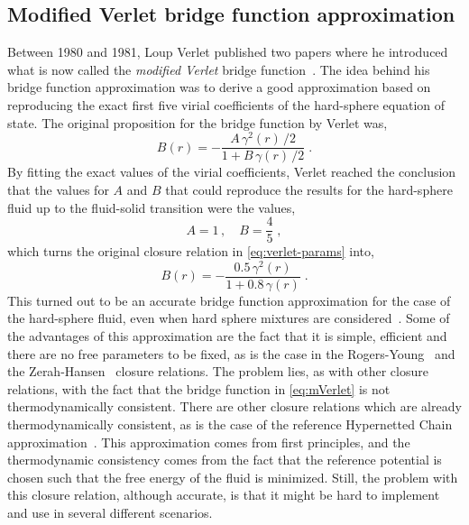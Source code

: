\subsection{Modified Verlet bridge function approximation}
Between 1980 and 1981, Loup Verlet published two papers where he introduced what is now 
called the \emph{modified Verlet} bridge 
function~\cite{verletIntegralEquationsClassical1980,verletIntegralEquationsClassical1981}. 
The idea behind his bridge function approximation was to derive a good approximation based 
on reproducing the exact first five virial coefficients of the hard-sphere equation of 
state. The original proposition for the bridge function by Verlet was,
\begin{equation}
    B(r) = - \frac{A \, \gamma^{2}(r) \, / 2}{1 + B \, \gamma(r) \, / 2}
    \; .
    \label{eq:verlet-params}
\end{equation}
By fitting the exact values of the virial coefficients, Verlet reached the conclusion that 
the values for \(A\) and \(B\) 
that could reproduce the results for the hard-sphere fluid up to the fluid-solid transition 
were the values,
\begin{equation}
    A = 1 \, , \quad B = \frac{4}{5}
    \; ,
    \label{eq:ab-verlet}
\end{equation}
which turns the original closure relation in \autoref{eq:verlet-params} into,
\begin{equation}
    B(r) = - \frac{0.5 \, \gamma^{2}(r)}{1 + 0.8 \, \gamma(r)}
    \; .
    \label{eq:mVerlet}
\end{equation}
This turned out to be an accurate bridge function approximation for the case of the 
hard-sphere fluid, even when hard sphere mixtures are 
considered~\cite{lopez-sanchezDemixingTransitionStructure2013a}.
Some of the advantages of this approximation are the fact that it is simple, efficient and 
there are no free parameters to be fixed, as is the case in the 
Rogers-Young~\cite{rogersNewThermodynamicallyConsistent1984b} and the 
Zerah-Hansen~\cite{zerahSelfConsistentIntegral1986} closure relations. The problem lies, as 
with other closure relations, with the fact that the bridge function in 
\autoref{eq:mVerlet} is not thermodynamically consistent. There are other closure relations 
which are already thermodynamically consistent, as is the case of the reference Hypernetted 
Chain approximation~\cite{ladoSolutionsReferencehypernettedchainEquation1983}. This 
approximation comes from first principles, and the thermodynamic consistency comes from the 
fact that the reference potential is chosen such that the free energy of the fluid is 
minimized. Still, the problem with this closure relation, although accurate, is that it 
might be hard to implement and use in several different scenarios.

